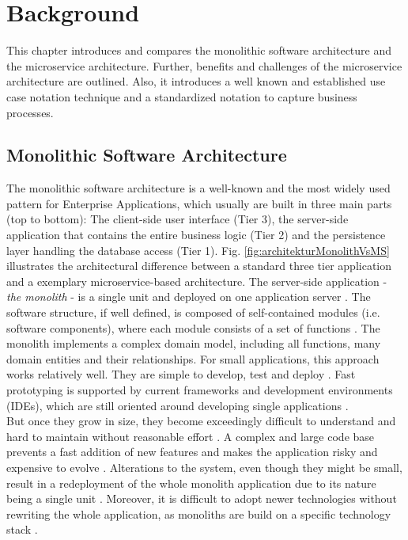 \chapter{Background}
\label{ch:background}
This chapter introduces and compares the monolithic software architecture and the microservice architecture. Further, benefits and challenges of the microservice architecture are outlined. Also, it introduces a well known and established use case notation technique and a standardized notation to capture business processes.



\section{Monolithic Software Architecture}
\label{sec:background:monolith}
The monolithic software architecture is a well-known and the most widely used pattern for Enterprise Applications, which usually are built in three main parts (top to bottom): The client-side user interface (Tier 3), the server-side application that contains the entire business logic (Tier 2) and the persistence layer handling the database access (Tier 1). Fig. \ref{fig:architekturMonolithVsMS} illustrates the architectural difference between a standard three tier application and a exemplary microservice-based architecture. The server-side application - \textit{the monolith} - is a single unit and deployed on one application server \cite{infoq}. The software structure, if well defined, is composed of self-contained modules (i.e. software components), where each module consists of a set of functions \cite{HeuristicsAlwis}.
The monolith implements a complex domain model, including all functions, many domain entities and their relationships.
For small applications, this approach works relatively well. They are simple to develop, test and deploy \cite{FunctionalDecompositionHeinrich}. Fast prototyping is supported by current frameworks and development environments (IDEs), which are still oriented around developing single applications \cite{infoq}.
\\
But once they grow in size, they become exceedingly difficult to understand and hard to maintain without reasonable effort \cite{FunctionalDecompositionHeinrich} \cite{ClassificationOfRefactoring}. A complex and large code base prevents a fast addition of new features and makes the application risky and expensive to evolve \cite{TowardsTechnique}.
Alterations to the system, even though they might be small, result in a redeployment of the whole monolith application due to its nature being a single unit \cite{FunctionalDecompositionHeinrich}. Moreover, it is difficult to adopt newer technologies without rewriting the whole application, as monoliths are build on a specific technology stack \cite{infoq} \cite{ExtractionMazlami}.\\
